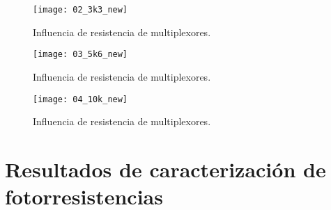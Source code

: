             \begin{figure}[hbtp]
                \centering
                \texttt{[image: 02\_3k3\_new]}
                \caption{Influencia de resistencia de multiplexores.}
                \label{fig:02_3k3_new}
            \end{figure}              
 
            \begin{figure}[hbtp]
                \centering
                \texttt{[image: 03\_5k6\_new]}
                \caption{Influencia de resistencia de multiplexores.}
                \label{fig:03_5k6_new}
            \end{figure}   

            \begin{figure}[hbtp]
                \centering
                \texttt{[image: 04\_10k\_new]}
                \caption{Influencia de resistencia de multiplexores.}
                \label{fig:04_10k_new}
            \end{figure}  
                
                     
\section{Resultados de caracterización de fotorresistencias}

